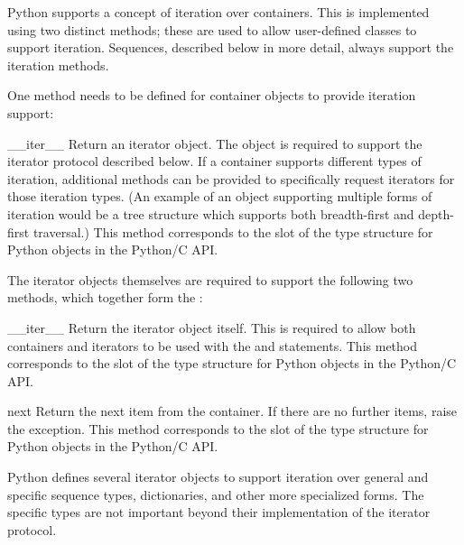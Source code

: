
Python supports a concept of iteration over containers.  This is
implemented using two distinct methods; these are used to allow
user-defined classes to support iteration.  Sequences, described below
in more detail, always support the iteration methods.

One method needs to be defined for container objects to provide
iteration support:

\begin{methoddesc}[container]{__iter__}{}
  Return an iterator object.  The object is required to support the
  iterator protocol described below.  If a container supports
  different types of iteration, additional methods can be provided to
  specifically request iterators for those iteration types.  (An
  example of an object supporting multiple forms of iteration would be
  a tree structure which supports both breadth-first and depth-first
  traversal.)  This method corresponds to the  slot of
  the type structure for Python objects in the Python/C API.
\end{methoddesc}

The iterator objects themselves are required to support the following
two methods, which together form the :

\begin{methoddesc}[iterator]{__iter__}{}
  Return the iterator object itself.  This is required to allow both
  containers and iterators to be used with the  and
   statements.  This method corresponds to the
   slot of the type structure for Python objects in
  the Python/C API.
\end{methoddesc}

\begin{methoddesc}[iterator]{next}{}
  Return the next item from the container.  If there are no further
  items, raise the  exception.  This method
  corresponds to the  slot of the type structure
  for Python objects in the Python/C API.
\end{methoddesc}

Python defines several iterator objects to support iteration over
general and specific sequence types, dictionaries, and other more
specialized forms.  The specific types are not important beyond their
implementation of the iterator protocol.

